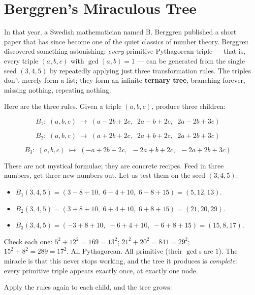 \documentclass[11pt,openright,twoside]{book}
\theoremstyle{definition}
\begin{document}
\bigskip


\section{Berggren's Miraculous Tree}

In that year, a Swedish mathematician named B. Berggren published a short paper that has since become one of the quiet classics of number theory. Berggren discovered something astonishing: \textit{every} primitive Pythagorean triple --- that is, every triple $(a, b, c)$ with $\gcd(a, b) = 1$ --- can be generated from the single seed $(3, 4, 5)$ by repeatedly applying just three transformation rules. The triples don't merely form a list; they form an infinite \textbf{ternary tree}, branching forever, missing nothing, repeating nothing.

Here are the three rules. Given a triple $(a, b, c)$, produce three children:

\[B_1:\; (a, b, c) \;\longmapsto\; (a - 2b + 2c,\;\; 2a - b + 2c,\;\; 2a - 2b + 3c)\]

\[B_2:\; (a, b, c) \;\longmapsto\; (a + 2b + 2c,\;\; 2a + b + 2c,\;\; 2a + 2b + 3c)\]

\[B_3:\; (a, b, c) \;\longmapsto\; (-a + 2b + 2c,\;\; -2a + b + 2c,\;\; -2a + 2b + 3c)\]

These are not mystical formulae; they are concrete recipes. Feed in three numbers, get three new numbers out. Let us test them on the seed $(3, 4, 5)$:

\begin{itemize}[leftmargin=*]
\item $B_1(3,4,5) = (3 - 8 + 10,\; 6 - 4 + 10,\; 6 - 8 + 15) = (5, 12, 13)$.
\item $B_2(3,4,5) = (3 + 8 + 10,\; 6 + 4 + 10,\; 6 + 8 + 15) = (21, 20, 29)$.
\item $B_3(3,4,5) = (-3 + 8 + 10,\; -6 + 4 + 10,\; -6 + 8 + 15) = (15, 8, 17)$.
\end{itemize}

Check each one: $5^2 + 12^2 = 169 = 13^2$; $21^2 + 20^2 = 841 = 29^2$; $15^2 + 8^2 = 289 = 17^2$. All Pythagorean. All primitive (their $\gcd$s are $1$). The miracle is that this never stops working, and the tree it produces is \textit{complete}: every primitive triple appears exactly once, at exactly one node.

Apply the rules again to each child, and the tree grows:
\end{document}
